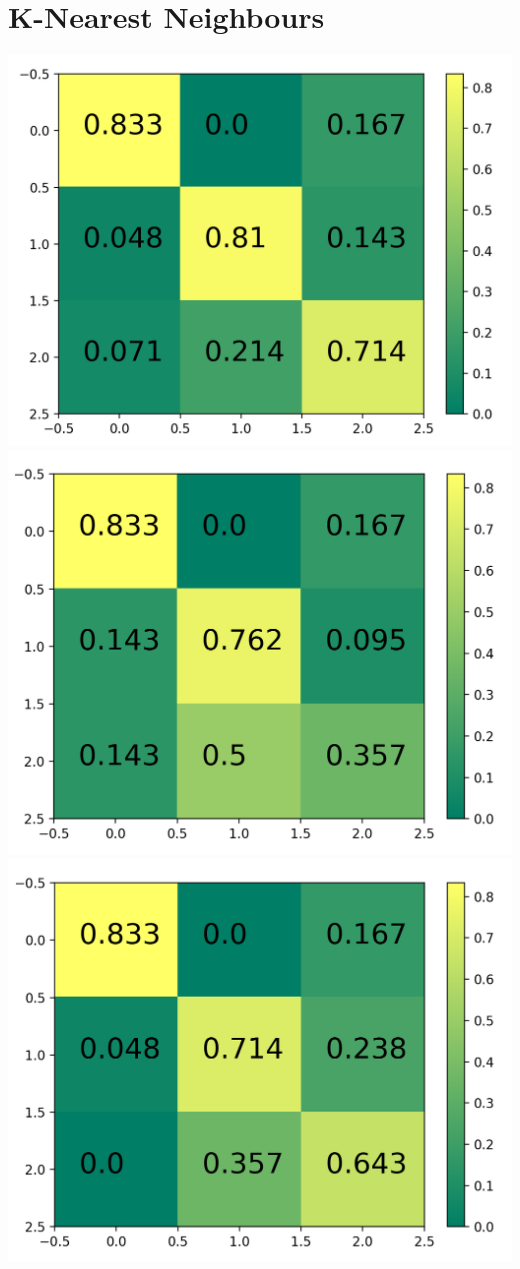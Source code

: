 \documentclass[11pt]{article}
\begin{document}
\section{K-Nearest Neighbours}
\includegraphics[scale=0.3]{Confusion_matrix(k=1)}
\includegraphics[scale=0.3]{Confusion_matrix(k=2)}
\includegraphics[scale=0.3]{Confusion_matrix(k=3)}
\end{document}
